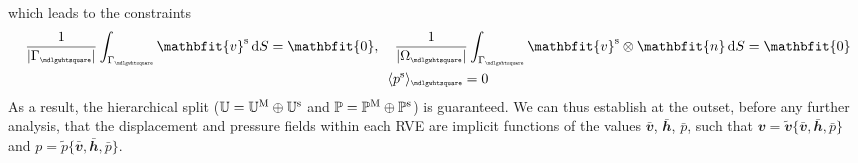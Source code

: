 \documentclass[12pt,a4paper]{article}
\renewcommand{\ta}[1]{\mathbfit{#1}}
\renewcommand{\ts}[1]{\mathbfit{#1}}
\renewcommand{\Box}{\mdlgwhtsquare}
\DeclarePairedDelimiter{\homgen}{\langle}{\rangle_\rve}
\newcommand{\volume}{|\Omega_\rve|}
\newcommand{\rve}{
  {\mathchoice
   {\mbox{\scalebox{0.67}{$\Box$}}}
   {\mbox{\scalebox{0.67}{$\Box$}}}
   {\mbox{\scalebox{0.5}{$\Box$}}}
   {\mbox{\scalebox{0.375}{$\Box$}}}
  }
}
\begin{document}
which leads to the constraints
\begin{subequations}\label{eq13}
\begin{gather}
    \frac{1}{|\Gamma_\rve|} \int_{\Gamma_\rve} \ta v^\fluct \dif S = \ta 0, \quad
    \frac{1}{\volume} \int_{\Gamma_\rve} \ta v^\fluct \outerp \ta n \dif S = \ts 0
\label{eq13a} \\
    \homgen{p^\fluct} = 0
\label{eq13b}
\end{gather}
\end{subequations}
As a result, the hierarchical split ($\mathbb{U} = \mathbb{U}^{\mathrm{M}} \oplus \mathbb{U}^{\mathrm{s}}$ and $\mathbb{P} = \mathbb{P}^{\mathrm{M}} \oplus \mathbb{P}^{\mathrm{s}}$) is guaranteed.
We can thus establish at the outset, before any further analysis, that the displacement and pressure fields within each RVE are implicit functions of the values $\bar{\ta v}$, $\bar{\ts h}$, $\bar{p}$, such that $\ta v = \tilde{\ta v}\{\bar{\ta v}, \bar{\ts h}, \bar{p}\}$ and $p = \tilde{p}\{\bar{\ta v}, \bar{\ts h}, \bar{p}\}$.
\end{document}
